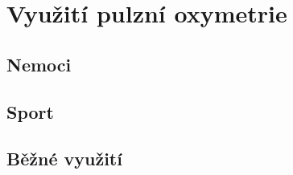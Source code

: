 \section {Využití pulzní oxymetrie}
\subsection {Nemoci}
\subsection {Sport}
\subsection {Běžné využití}